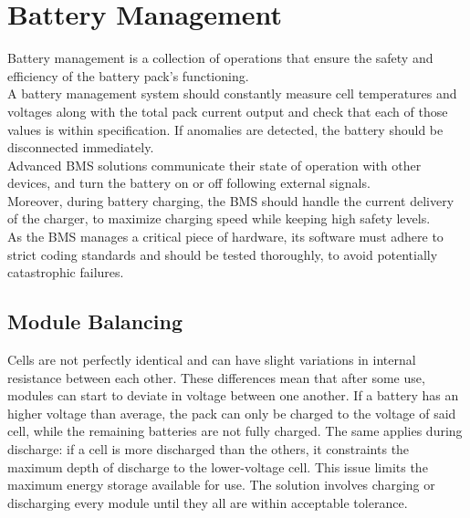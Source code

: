 \section{Battery Management}
Battery management is a collection of operations that ensure the safety and efficiency of the battery pack's functioning.\\
A battery management system should constantly measure cell temperatures and voltages along with the total pack current output and check that each of those values is within specification. If anomalies are detected, the battery should be disconnected immediately.\\
Advanced BMS solutions communicate their state of operation with other devices, and turn the battery on or off following external signals.\\
Moreover, during battery charging, the BMS should handle the current delivery of the charger, to maximize charging speed while keeping high safety levels.\\
As the BMS manages a critical piece of hardware, its software must adhere to strict coding standards and should be tested thoroughly, to avoid potentially catastrophic failures.

\subsection{Module Balancing}
Cells are not perfectly identical and can have slight variations in internal resistance between each other. These differences mean that after some use, modules can start to deviate in voltage between one another. If a battery has an higher voltage than average, the pack can only be charged to the voltage of said cell, while the remaining batteries are not fully charged. The same applies during discharge: if a cell is more discharged than the others, it constraints the maximum depth of discharge to the lower-voltage cell.
This issue limits the maximum energy storage available for use. The solution involves charging or discharging every module until they all are within acceptable tolerance.\\

